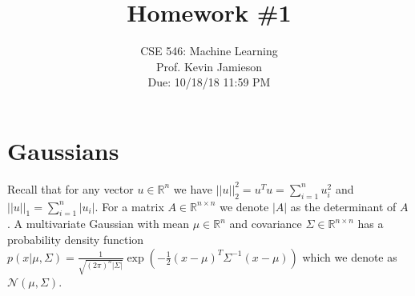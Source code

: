 \documentclass{article}
\date{{}}
\newcommand{\1}{\mathbf{1}}
\def\R{\mathbb{R}}
\begin{document}
\title{Homework \#1}
\author{\normalsize{CSE 546: Machine Learning}\\
\normalsize{Prof. Kevin Jamieson} \\
\normalsize{Due: 10/18/18  11:59 PM}}
\maketitle


\section{Gaussians}
Recall that for any vector $u \in \R^n$ we have $||u||_2^2 = u^T u = \sum_{i=1}^n u_i^2$ and $||u||_1 = \sum_{i=1}^n |u_i|$. 
For a matrix $A \in \R^{n \times n}$ we denote $|A|$ as the determinant of $A$.
A multivariate Gaussian with mean $\mu \in \R^n$ and covariance $\Sigma \in \R^{n \times n}$ has a probability density function $p(x| \mu, \Sigma) =  \frac{1}{\sqrt{(2\pi)^n |\Sigma|}} \exp( -\frac{1}{2} (x-\mu)^T \Sigma^{-1} (x-\mu) )$ which we denote as $\mathcal{N}(\mu,\Sigma)$. \\
\end{document}
